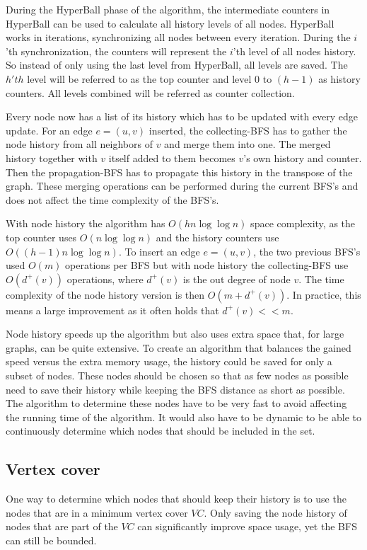 During the HyperBall phase of the algorithm, the intermediate counters in HyperBall can be used to calculate all history levels of all nodes. HyperBall works in iterations, synchronizing all nodes between every iteration. During the $i$'th synchronization, the counters will represent the $i$'th level of all nodes history. So instead of only using the last level from HyperBall, all levels are saved. The $h'th$ level will be referred to as the top counter and level $0$ to $(h-1)$ as history counters. All levels combined will be referred as counter collection.  

Every node now has a list of its history which has to be updated with every edge update. For an edge $e = (u,v)$ inserted, the collecting-BFS has to gather the node history from all neighbors of $v$ and merge them into one. The merged history together with $v$ itself added to them becomes $v$'s own history and counter. Then the propagation-BFS has to propagate this history in the transpose of the graph. These merging operations can be performed during the current BFS's and does not affect the time complexity of the BFS's.

With node history the algorithm has $O(hn \log \log n)$ space complexity, as the top counter uses $O(n \log \log n)$ and the history counters use $O((h-1)n \log \log n)$. To insert an edge $e = (u,v)$, the two previous BFS's used $O(m)$ operations per BFS but with node history the collecting-BFS use $O(d^+(v))$ operations, where $d^+(v)$ is the out degree of node $v$. The time complexity of the node history version is then $O(m + d^+(v))$. In practice, this means a large improvement as it often holds that $d^+(v) << m$.

Node history speeds up the algorithm but also uses extra space that, for large graphs, can be quite extensive. To create an algorithm that balances the gained speed versus the extra memory usage, the history could be saved for only a subset of nodes. These nodes should be chosen so that as few nodes as possible need to save their history while keeping the BFS distance as short as possible. The algorithm to determine these nodes have to be very fast to avoid affecting the running time of the algorithm. It would also have to be dynamic to be able to continuously determine which nodes that should be included in the set.

\subsection{Vertex cover}
\label{sec:vertex_cover}
One way to determine which nodes that should keep their history is to use the nodes that are in a minimum vertex cover $VC$. Only saving the node history of nodes that are part of the $VC$ can significantly improve space usage, yet the BFS can still be bounded.

